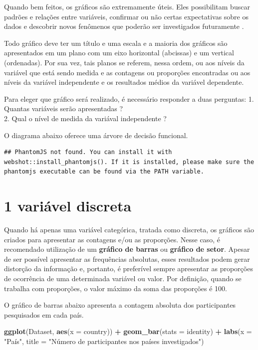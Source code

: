 \documentclass[
]{book}
\newenvironment{Shaded}{\begin{snugshade}}{\end{snugshade}}
\newcommand{\DataTypeTok}[1]{\textcolor[rgb]{0.13,0.29,0.53}{#1}}
\newcommand{\KeywordTok}[1]{\textcolor[rgb]{0.13,0.29,0.53}{\textbf{#1}}}
\newcommand{\NormalTok}[1]{#1}
\newcommand{\OperatorTok}[1]{\textcolor[rgb]{0.81,0.36,0.00}{\textbf{#1}}}
\newcommand{\StringTok}[1]{\textcolor[rgb]{0.31,0.60,0.02}{#1}}
\begin{document}
Quando bem feitos, os gráficos são extremamente úteis. Eles possibilitam buscar padrões e relações entre variáveis, confirmar ou não certas expectativas sobre os dados e descobrir novos fenômenos que poderão ser investigados futuramente \citep{morettin_bussab_2010}.

Todo gráfico deve ter um título e uma escala e a maioria dos gráficos são apresentados em um plano com um eixo horizontal (abcissas) e um vertical (ordenadas). Por sua vez, tais planos se referem, nessa ordem, ou aos níveis da variável que está sendo medida e as contagens ou proporções encontradas ou aos níveis da variável independente e os resultados médios da variável dependente.

Para eleger que gráfico será realizado, é necessário responder a duas perguntas:
1. Quantas variáveis serão apresentadas ?\\
2. Qual o nível de medida da variával independente ?

O diagrama abaixo oferece uma árvore de decisão funcional.

\begin{verbatim}
## PhantomJS not found. You can install it with webshot::install_phantomjs(). If it is installed, please make sure the phantomjs executable can be found via the PATH variable.
\end{verbatim}

\hypertarget{htmlwidget-8765dcbeed66bacca0a7}{}

\hypertarget{variuxe1vel-discreta}{%
\section{1 variável discreta}\label{variuxe1vel-discreta}}

Quando há apenas uma variável categórica, tratada como discreta, os gráficos são criados para apresentar as contagens e/ou as proporções. Nesse caso, é recomendado utilização de um \textbf{gráfico de barras} ou \textbf{gráfico de setor}. Apesar de ser possível apresentar as frequências absolutas, esses resultados podem gerar distorção da informação e, portanto, é preferível sempre apresentar as proporções de ocorrência de uma determinada variável ou valor. Por definição, quando se trabalha com proporções, o valor máximo da soma das proporções é 100.

O gráfico de barras abaixo apresenta a contagem absoluta dos participantes pesquisados em cada país.

\begin{Shaded}
\begin{Highlighting}[]
\KeywordTok{ggplot}\NormalTok{(Dataset, }\KeywordTok{aes}\NormalTok{(}\DataTypeTok{x =}\NormalTok{ country)) }\OperatorTok{+}
\StringTok{  }\KeywordTok{geom_bar}\NormalTok{(}\DataTypeTok{stats =}\NormalTok{ identity) }\OperatorTok{+}
\StringTok{  }\KeywordTok{labs}\NormalTok{(}\DataTypeTok{x =} \StringTok{"País"}\NormalTok{, }\DataTypeTok{title =} \StringTok{"Número de participantes nos países investigados"}\NormalTok{)}
\end{Highlighting}
\end{Shaded}
\end{document}
